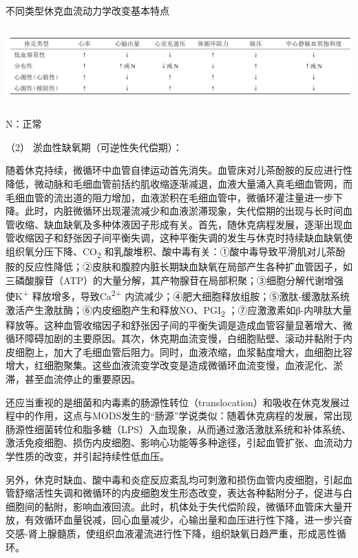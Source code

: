 \begin{table}[htbp]
\centering
\caption{不同类型休克血流动力学改变基本特点}
\label{tab19-1}
\includegraphics[width=6.58333in,height=1.16667in]{./images/Image00083.jpg}
\end{table}

N：正常

\hypertarget{text00055.htmlux5cux23CHP2-1-1-2-1-1-2}{}
（2） 淤血性缺氧期（可逆性失代偿期）：

随着休克持续，微循环中血管自律运动首先消失。血管床对儿茶酚胺的反应进行性降低，微动脉和毛细血管前括约肌收缩逐渐减退，血液大量涌入真毛细血管网，而毛细血管的流出道的阻力增加，血液淤积在毛细血管中，微循环灌注量进一步下降。此时，内脏微循环出现灌流减少和血液淤滞现象，失代偿期的出现与长时间血管收缩、缺血缺氧及多种体液因子形成有关。首先，随休克病程发展，逐渐出现血管收缩因子和舒张因子间平衡失调，这种平衡失调的发生与休克时持续缺血缺氧使组织氧分压下降、CO\textsubscript{2}
和乳酸堆积、酸中毒有关：①酸中毒导致平滑肌对儿茶酚胺的反应性降低；②皮肤和腹腔内脏长期缺血缺氧在局部产生各种扩血管因子，如三磷酸腺苷（ATP）的大量分解，其产物腺苷在局部积聚；③细胞分解代谢增强使K\textsuperscript{+}
释放增多，导致Ca\textsuperscript{2+}
内流减少；④肥大细胞释放组胺；⑤激肽-缓激肽系统激活产生激肽酶；⑥内皮细胞产生和释放NO、PGI\textsubscript{2}
；⑦应激激素如β-内啡肽大量释放等。这种血管收缩因子和舒张因子间的平衡失调是造成血管容量显著增大、微循环障碍加剧的主要原因。其次，休克期血流变慢，白细胞贴壁、滚动并黏附于内皮细胞上，加大了毛细血管后阻力。同时，血液浓缩，血浆黏度增大，血细胞比容增大，红细胞聚集。这些血液流变学改变是造成微循环血流变慢，血液泥化、淤滞，甚至血流停止的重要原因。

还应当重视的是细菌和内毒素的肠源性转位（translocation）和吸收在休克发展过程中的作用，这点与MODS发生的“肠源”学说类似：随着休克病程的发展，常出现肠源性细菌转位和脂多糖（LPS）入血现象，从而通过激活激肽系统和补体系统、激活免疫细胞、损伤内皮细胞、影响心功能等多种途径，引起血管扩张、血流动力学性质的改变，并引起持续性低血压。

另外，休克时缺血、酸中毒和炎症反应紊乱均可刺激和损伤血管内皮细胞，引起血管舒缩活性失调和微循环的内皮细胞发生形态改变，表达各种黏附分子，促进与白细胞间的黏附，影响血液回流。此时，机体处于失代偿阶段，微循环血管床大量开放，有效循环血量锐减，回心血量减少，心输出量和血压进行性下降，进一步兴奋交感-肾上腺髓质，使组织血液灌流进行性下降，组织缺氧日趋严重，形成恶性循环。

